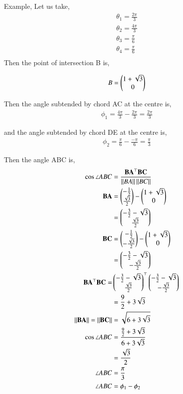 \documentclass[journal,12pt,twocolumn]{IEEEtran}
\begin{document}
\begin{enumerate}
Example,
Let us take,
		\begin{align}
			\theta_1 = \frac{2\pi}{3}\\
			\theta_2 = \frac{4\pi}{3}\\
			\theta_3 = \frac{\pi}{6}\\
			\theta_4 = \frac{\pi}{6}\\
		\end{align}
Then the point of intersection B is,

		\begin{align}
			B = \begin{pmatrix}1+\sqrt{3}\\0\end{pmatrix}
		\end{align}

Then the angle subtended by chord AC at the centre is,
		\begin{align}
			\phi_1 = \frac{4\pi}{3}-\frac{2\pi}{3} = \frac{2\pi}{3}
		\end{align}

and the angle subtended by chord DE at the centre is,
		\begin{align}
			\phi_2 = \frac{\pi}{6}-\frac{-\pi}{6} = \frac{\pi}{3}
		\end{align}

Then the angle ABC is,
		\begin{align}
			\cos \angle ABC &= \frac{\mathbf{BA}^{\top} \mathbf{BC}}{\left\lVert BA\right\rVert\left\lVert BC\right\rVert}\\
				\mathbf{BA} &= \begin{pmatrix}-\frac{1}{2}\\\frac{\sqrt{3}}{2}\end{pmatrix} - \begin{pmatrix}1+\sqrt{3}\\0\end{pmatrix}\\
				    &= \begin{pmatrix}-\frac{3}{2}-\sqrt{3}\\\frac{\sqrt{3}}{2}\end{pmatrix}\\
				\mathbf{BC} &= \begin{pmatrix}-\frac{1}{2}\\-\frac{\sqrt{3}}{2}\end{pmatrix} - \begin{pmatrix}1+\sqrt{3}\\0\end{pmatrix}\\
				    &= \begin{pmatrix}-\frac{3}{2}-\sqrt{3}\\-\frac{\sqrt{3}}{2}\end{pmatrix}\\
			\mathbf{BA}^{\top} \mathbf{BC} = &\begin{pmatrix}-\frac{3}{2}-\sqrt{3}\\\frac{\sqrt{3}}{2}\end{pmatrix}^{\top}\begin{pmatrix}-\frac{3}{2}-\sqrt{3}\\-\frac{\sqrt{3}}{2}\end{pmatrix}\\
			  	   &= \frac{9}{2} + 3\sqrt{3}\\
	\left\lVert\mathbf{BA}\right\rVert = \left\lVert\mathbf{BC}\right\rVert &= \sqrt{6+3\sqrt{3}}\\
			\cos \angle ABC &= \frac{\frac{9}{2}+3\sqrt{3}}{6+3\sqrt{3}}\\
				   &= \frac{\sqrt{3}}{2}\\
			     \angle ABC &= \frac{\pi}{3}\\
			     \angle ABC &= \phi_1-\phi_2
		\end{align}



		\begin{table}[h]
			\centering
			
			\caption{}
			\label{tab:1}
		\end{table}

\end{enumerate}
\end{document}
